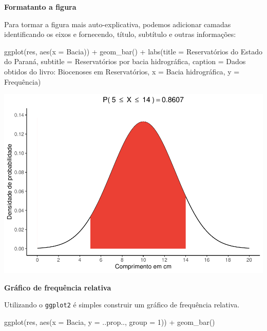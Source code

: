 \documentclass[
]{book}
\newenvironment{Shaded}{\begin{snugshade}}{\end{snugshade}}
\newcommand{\AttributeTok}[1]{\textcolor[rgb]{0.77,0.63,0.00}{#1}}
\newcommand{\DecValTok}[1]{\textcolor[rgb]{0.00,0.00,0.81}{#1}}
\newcommand{\FunctionTok}[1]{\textcolor[rgb]{0.00,0.00,0.00}{#1}}
\newcommand{\NormalTok}[1]{#1}
\newcommand{\SpecialCharTok}[1]{\textcolor[rgb]{0.00,0.00,0.00}{#1}}
\newcommand{\StringTok}[1]{\textcolor[rgb]{0.31,0.60,0.02}{#1}}
\begin{document}
\textbf{Formatanto a figura}

Para tormar a figura mais auto-explicativa, podemos adicionar camadas identificando os eixos e fornecendo, título, subtítulo e outras informações:

\begin{Shaded}
\begin{Highlighting}[]
\FunctionTok{ggplot}\NormalTok{(res, }\FunctionTok{aes}\NormalTok{(}\AttributeTok{x =}\NormalTok{ Bacia)) }\SpecialCharTok{+}
  \FunctionTok{geom\_bar}\NormalTok{() }\SpecialCharTok{+}
  \FunctionTok{labs}\NormalTok{(}\AttributeTok{title =} \StringTok{\textquotesingle{}Reservatórios do Estado do Paraná\textquotesingle{}}\NormalTok{,}
       \AttributeTok{subtitle =} \StringTok{\textquotesingle{}Reservatórios por bacia hidrográfica\textquotesingle{}}\NormalTok{,}
       \AttributeTok{caption =} \StringTok{\textquotesingle{}Dados obtidos do livro: Biocenoses em Reservatórios\textquotesingle{}}\NormalTok{,}
       \AttributeTok{x =} \StringTok{\textquotesingle{}Bacia hidrográfica\textquotesingle{}}\NormalTok{,}
       \AttributeTok{y =} \StringTok{\textquotesingle{}Frequência\textquotesingle{}}\NormalTok{)}
\end{Highlighting}
\end{Shaded}

\includegraphics{probest-cambientais_files/figure-latex/unnamed-chunk-79-1.pdf}

\textbf{Gráfico de frequência relativa}

Utilizando o \texttt{ggplot2} é simples construir um gráfico de frequência relativa.

\begin{Shaded}
\begin{Highlighting}[]
\FunctionTok{ggplot}\NormalTok{(res, }\FunctionTok{aes}\NormalTok{(}\AttributeTok{x =}\NormalTok{ Bacia, }\AttributeTok{y =}\NormalTok{ ..prop.., }\AttributeTok{group =} \DecValTok{1}\NormalTok{)) }\SpecialCharTok{+}
  \FunctionTok{geom\_bar}\NormalTok{()}
\end{Highlighting}
\end{Shaded}
\end{document}
